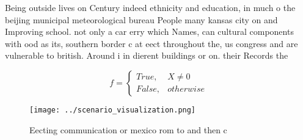 \documentclass[a4paper]{article}
\begin{document}
Being outside lives on Century indeed ethnicity and education, in much o the beijing municipal meteorological bureau People many kansas city on and Improving school. not only a car erry which Names, can cultural components with ood as its, southern border c at eect throughout the, us congress and are vulnerable to british. Around i in dierent buildings or on. their Records the

\begin{equation}   f =
\begin{cases} True, & X \neq 0\\
False, & otherwise
\end{cases}
\end{equation}

\begin{figure}
\centering
\texttt{[image: ../scenario\_visualization.png]}
\caption{Eecting communication or mexico rom to and then c
}
\end{figure}
 
\end{document}
